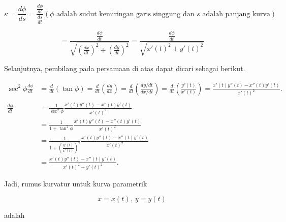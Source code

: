 \documentclass[a4paper,10pt]{article}
\begin{document}
\begin{eulernotebook}
\begin{eulercomment}
\begin{eulercomment}
\begin{eulercomment}
\begin{eulercomment}
\begin{eulercomment}
\begin{eulercomment}
\begin{eulercomment}
\begin{eulercomment}
\begin{eulercomment}
\begin{eulercomment}
\begin{eulercomment}
\begin{eulercomment}
\begin{eulercomment}
\begin{eulercomment}
\begin{eulercomment}
\begin{eulercomment}
\begin{eulercomment}
\begin{eulercomment}
\begin{eulercomment}
\begin{eulercomment}
\begin{eulercomment}
\begin{eulercomment}
\begin{eulercomment}
\end{eulercomment}
\begin{eulerformula}
\[
\kappa=\frac{d\phi}{ds}=\frac{\frac{d\phi}{dt}}{\frac{ds}{dt}}  (\phi \text{ adalah sudut kemiringan garis singgung dan } s \text{ adalah panjang kurva})
\]
\end{eulerformula}
\begin{eulercomment}
\end{eulercomment}
\begin{eulerformula}
\[
=\frac{\frac{d\phi}{dt}}{\sqrt{(\frac{dx}{dt})^2 + (\frac{dy}{dt})^2}} = \frac{\frac{d\phi}{dt}}{\sqrt{x'(t)^2+y'(t)^2}}
\]
\end{eulerformula}
\begin{eulercomment}
Selanjutnya, pembilang pada persamaan di atas dapat dicari sebagai
berikut.

\end{eulercomment}
\begin{eulerformula}
\[
\begin{aligned}\sec^2\phi\frac{d\phi}{dt} &= \frac{d}{dt}\left(\tan\phi\right)= \frac{d}{dt}\left(\frac{dy}{dx}\right)= \frac{d}{dt}\left(\frac{dy/dt}{dx/dt}\right)= \frac{d}{dt}\left(\frac{y'(t)}{x'(t)}\right)=\frac{x'(t)y''(t)-x''(t)y'(t)}{x'(t)^2}.\\ & \\ \frac{d\phi}{dt} &= \frac{1}{\sec^2\phi}\frac{x'(t)y''(t)-x''(t)y'(t)}{x'(t)^2}\\ &= \frac{1}{1+\tan^2\phi}\frac{x'(t)y''(t)-x''(t)y'(t)}{x'(t)^2}\\ &= \frac{1}{1+\left(\frac{y'(t)}{x'(t)}\right)^2}\frac{x'(t)y''(t)-x''(t)y'(t)}{x'(t)^2}\\ &= \frac{x'(t)y''(t)-x''(t)y'(t)}{x'(t)^2+y'(t)^2}.\end{aligned}
\]
\end{eulerformula}
\begin{eulercomment}
Jadi, rumus kurvatur untuk kurva parametrik

\end{eulercomment}
\begin{eulerformula}
\[
x=x(t),\ y=y(t)
\]
\end{eulerformula}
\begin{eulercomment}
adalah


\end{eulercomment}
\end{eulercomment}
\end{eulercomment}
\end{eulercomment}
\end{eulercomment}
\end{eulercomment}
\end{eulercomment}
\end{eulercomment}
\end{eulercomment}
\end{eulercomment}
\end{eulercomment}
\end{eulercomment}
\end{eulercomment}
\end{eulercomment}
\end{eulercomment}
\end{eulercomment}
\end{eulercomment}
\end{eulercomment}
\end{eulercomment}
\end{eulercomment}
\end{eulercomment}
\end{eulercomment}
\end{eulercomment}
\end{eulernotebook}
\end{document}
